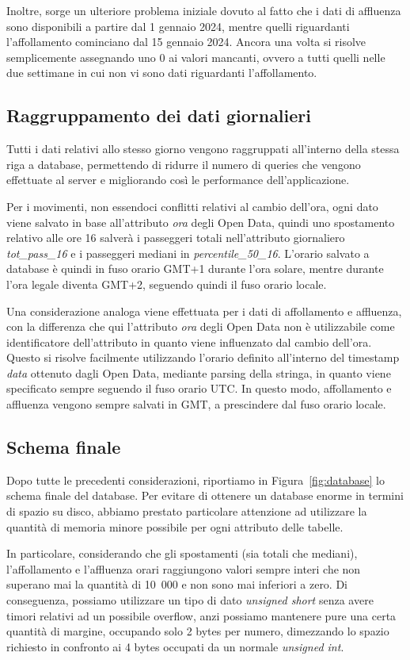 Inoltre, sorge un ulteriore problema iniziale dovuto al fatto che i dati di affluenza sono disponibili a partire dal 1 gennaio 2024, mentre quelli riguardanti l'affollamento cominciano dal 15 gennaio 2024. Ancora una volta si risolve semplicemente assegnando uno 0 ai valori mancanti, ovvero a tutti quelli nelle due settimane in cui non vi sono dati riguardanti l'affollamento.

\subsection{Raggruppamento dei dati giornalieri}
Tutti i dati relativi allo stesso giorno vengono raggruppati all'interno della stessa riga a database, permettendo di ridurre il numero di queries che vengono effettuate al server e migliorando così le performance dell'applicazione.

Per i movimenti, non essendoci conflitti relativi al cambio dell'ora, ogni dato viene salvato in base all'attributo \textit{ora} degli Open Data, quindi uno spostamento relativo alle ore 16 salverà i passeggeri totali nell'attributo giornaliero \textit{tot\_pass\_16} e i passeggeri mediani in \textit{percentile\_50\_16}. L'orario salvato a database è quindi in fuso orario GMT+1 durante l'ora solare, mentre durante l'ora legale diventa GMT+2, seguendo quindi il fuso orario locale.

Una considerazione analoga viene effettuata per i dati di affollamento e affluenza, con la differenza che qui l'attributo \textit{ora} degli Open Data non è utilizzabile come identificatore dell'attributo in quanto viene influenzato dal cambio dell'ora. Questo si risolve facilmente utilizzando l'orario definito all'interno del timestamp \textit{data} ottenuto dagli Open Data, mediante parsing della stringa, in quanto viene specificato sempre seguendo il fuso orario UTC. In questo modo, affollamento e affluenza vengono sempre salvati in GMT, a prescindere dal fuso orario locale.

\subsection{Schema finale}
Dopo tutte le precedenti considerazioni, riportiamo in Figura~\ref{fig:database} lo schema finale del database. Per evitare di ottenere un database enorme in termini di spazio su disco, abbiamo prestato particolare attenzione ad utilizzare la quantità di memoria minore possibile per ogni attributo delle tabelle.

In particolare, considerando che gli spostamenti (sia totali che mediani), l'affollamento e l'affluenza orari raggiungono valori sempre interi che non superano mai la quantità di 10~000 e non sono mai inferiori a zero. Di conseguenza, possiamo utilizzare un tipo di dato \textit{unsigned short} senza avere timori relativi ad un possibile overflow, anzi possiamo mantenere pure una certa quantità di margine, occupando solo 2 bytes per numero, dimezzando lo spazio richiesto in confronto ai 4 bytes occupati da un normale \textit{unsigned int}.

